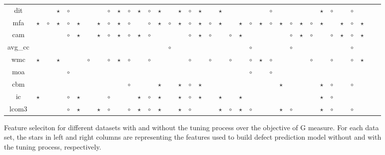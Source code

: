 \documentclass{sig-alternative}
\begin{document}
\begin{figure}[!ht]
\begin{tabular}{c|c c|c c|c c|c c|c c|c c|c c|c c|c c|c c|c c|c c|c c|c c|c c|c c|c c|c }
dit& & & $\star$& $\circ$& & & & $\circ$& $\star$& $\circ$& $\star$& $\circ$& $\star$& & $\star$& $\circ$& $\star$& & $\star$& & & & & $\circ$& & & & & $\star$& $\circ$& & $\circ$& & \\
mfa& $\star$& $\circ$& $\star$& $\circ$& $\star$& & $\star$& $\circ$& $\star$& $\circ$& & $\circ$& $\star$& $\circ$& $\star$& $\circ$& $\star$& $\circ$& $\star$& & $\star$& $\circ$& $\star$& $\circ$& $\star$& $\circ$& $\star$& $\circ$& $\star$& & $\star$& $\circ$& $\star$& \\
cam& & & & $\circ$& $\star$& & $\star$& $\circ$& $\star$& $\circ$& $\star$& $\circ$& & & & $\circ$& $\star$& $\circ$& & $\circ$& $\star$& & & & & $\circ$& $\star$& $\circ$& & $\circ$& $\star$& $\circ$& $\star$& \\
avg\_cc& & & & & & & & & & & & & & $\circ$& & & & & & & & $\circ$& & & & $\circ$& & & & & & $\circ$& & \\
wmc& $\star$& & $\star$& & & $\circ$& & $\circ$& $\star$& $\circ$& & $\circ$& & & & $\circ$& & $\circ$& & $\circ$& & $\circ$& $\star$& $\circ$& & & & $\circ$& & $\circ$& & $\circ$& $\star$& \\
moa& & & & $\circ$& & & & & & & & & & & & & & & & & & $\circ$& & $\circ$& & & & & & & & & & \\
cbm& & & & & & & & & & $\circ$& & & $\star$& & $\star$& $\circ$& $\star$& & & & & & & & $\star$& & & & $\star$& $\circ$& & $\circ$& & \\
ic& $\star$& & & $\circ$& $\star$& & & $\circ$& & & $\star$& $\circ$& $\star$& & $\star$& $\circ$& $\star$& & $\star$& & $\star$& & & & & & & & $\star$& $\circ$& & & & \\
lcom3& & & & $\circ$& $\star$& & $\star$& $\circ$& & $\circ$& $\star$& $\circ$& $\star$& & $\star$& $\circ$& & & $\star$& $\circ$& $\star$& $\circ$& & & $\star$& $\circ$& & & $\star$& $\circ$& & $\circ$& & \\

  \end{tabular}
    \caption{Feature seleciton for different datasets with and without the tuning process over the objective of G measure. For each data set, the stars in left and right columns are representing the features used to build defect prediction model without and with the tuning process, respectively.}
\end{figure}
\end{document}
